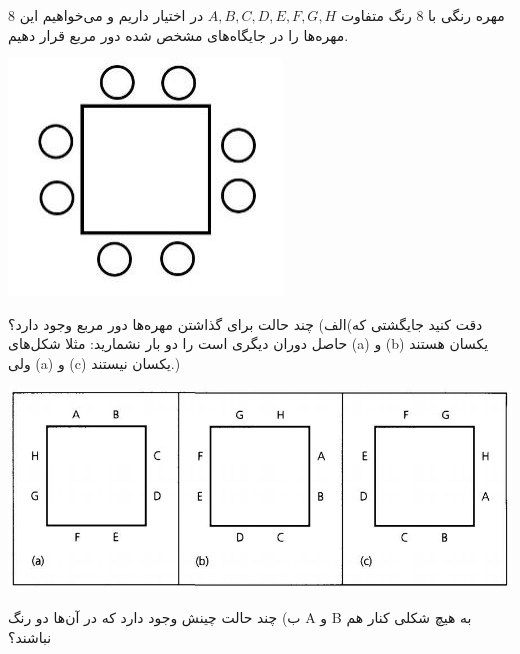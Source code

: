 \EXERCISE
$8$
 مهره رنگی با 
$8$
  رنگ متفاوت 
$A, B, C, D, E, F, G, H$
در اختیار داریم و می‌خواهیم این مهره‌ها را در جایگاه‌های مشخص شده دور مربع قرار دهیم.
    \begin{center}
     	\includegraphics[scale=0.2]{./1.png}
    \end{center}
الف) چند حالت برای گذاشتن مهره‌ها دور مربع وجود دارد؟(دقت کنید جایگشتی که حاصل دوران دیگری است را دو بار نشمارید: مثلا شکل‌های (a) و (b) یکسان هستند ولی (a) و (c) یکسان نیستند.)
\begin{center}
	\includegraphics[scale=0.3]{./2.png}
\end{center}
ب) چند حالت چینش وجود دارد که در آن‌ها دو رنگ A و B به هیچ شکلی کنار هم نباشند؟